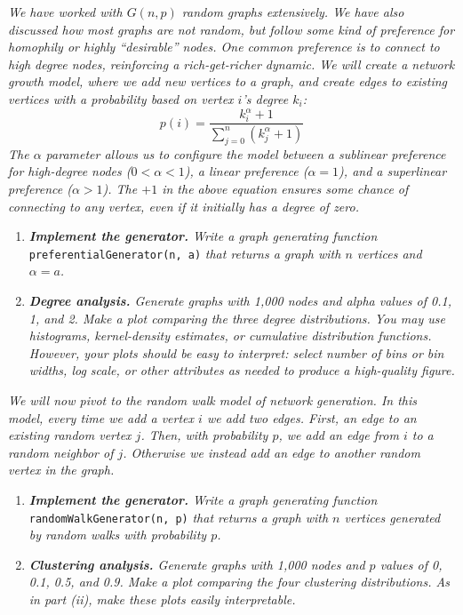 \documentclass{article}
\newcommand{\pl}{\left(}
\newcommand{\pr}{\right)}
\begin{document}
\textit{We have worked with $G(n,p)$ random graphs extensively. We have also discussed how most graphs are not random, but follow some kind of preference for homophily or highly ``desirable'' nodes. One common preference is to connect to high degree nodes, reinforcing a rich-get-richer dynamic. We will create a network growth model, where we add new vertices to a graph, and create edges to existing vertices with a probability based on vertex $i$'s degree $k_i$:}
\[
    p(i) = \frac{k_i^{\alpha} + 1}{\sum_{j=0}^{n} \pl k_j^{\alpha} + 1 \pr}
\]
\textit{The $\alpha$ parameter allows us to configure the model between a sublinear preference for high-degree nodes ($0 < \alpha < 1$), a linear preference ($\alpha = 1$), and a superlinear preference ($\alpha > 1$). The $+1$ in the above equation ensures some chance of connecting to any vertex, even if it initially has a degree of zero.}
\begin{enumerate}[label=(\roman*)]
    \item \textit{\textbf{Implement the generator.} Write a graph generating function }\texttt{preferentialGenerator(n, a)}\textit{ that returns a graph with $n$ vertices and $\alpha = a$.}
    \item \textit{\textbf{Degree analysis.} Generate graphs with 1,000 nodes and alpha values of 0.1, 1, and 2. Make a plot comparing the three degree distributions. You may use histograms, kernel-density estimates, or cumulative distribution functions. However, your plots should be easy to interpret: select number of bins or bin widths, log scale, or other attributes as needed to produce a high-quality figure.}
\end{enumerate}
\textit{We will now pivot to the random walk model of network generation. In this model, every time we add a vertex $i$ we add two edges. First, an edge to an existing random vertex $j$. Then, with probability $p$, we add an edge from $i$ to a random neighbor of $j$. Otherwise we instead add an edge to another random vertex in the graph.}
\begin{enumerate}[label=(\roman*), resume]
    \item \textit{\textbf{Implement the generator.} Write a graph generating function }\texttt{randomWalkGenerator(n, p)}\textit{ that returns a graph with $n$ vertices generated by random walks with probability $p$.}
    \item \textit{\textbf{Clustering analysis.} Generate graphs with 1,000 nodes and $p$ values of 0, 0.1, 0.5, and 0.9. Make a plot comparing the four clustering distributions. As in part (ii), make these plots easily interpretable.}
\end{enumerate}
\end{document}

